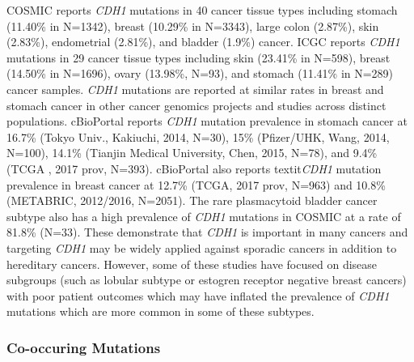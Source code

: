 COSMIC reports \textit{CDH1} mutations in 40 cancer tissue types including stomach (11.40\% in N=1342), breast (10.29\% in N=3343), large colon (2.87\%), skin (2.83\%), endometrial (2.81\%), and bladder (1.9\%) cancer. ICGC reports \textit{CDH1} mutations in 29 cancer tissue types including skin (23.41\% in N=598), breast (14.50\% in N=1696), ovary (13.98\%, N=93), and stomach (11.41\% in N=289) cancer samples. \textit{CDH1} mutations are reported at similar rates in breast and stomach cancer in other cancer genomics projects and studies across distinct populations. cBioPortal reports \textit{CDH1} mutation prevalence in stomach cancer at 16.7\% (Tokyo Univ., Kakiuchi, 2014, N=30), 15\% (Pfizer/UHK,  Wang, 2014, N=100), 14.1\% (Tianjin Medical University, Chen, 2015, N=78), and 9.4\% (TCGA , 2017 prov, N=393). cBioPortal also reports textit{\textit{CDH1}} mutation prevalence in breast cancer at 12.7\% (TCGA, 2017 prov, N=963) and 10.8\% (METABRIC, 2012/2016, N=2051). The rare plasmacytoid bladder cancer subtype also has a high prevalence of \textit{CDH1} mutations in COSMIC at a rate of 81.8\% (N=33). These demonstrate that \textit{CDH1} is important in many cancers and targeting \textit{CDH1} may be widely applied against sporadic cancers in addition to hereditary cancers. However, some of these studies have focused on disease subgroups (such as lobular subtype or estogren receptor negative breast cancers) with poor patient outcomes which may have inflated the prevalence of \textit{CDH1} mutations which are more common in some of these subtypes.

\subsubsection{Co-occuring Mutations}

